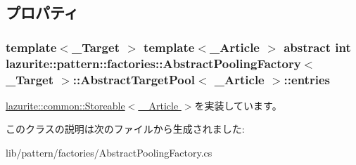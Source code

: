\subsection{プロパティ}
\hypertarget{classlazurite_1_1pattern_1_1factories_1_1_abstract_pooling_factory_3_01___target_01_4_1_1_abstra513b29652c04fa77de240c337e958a8d_aae51e859cb8f4ce8f15dd3db69046711}{
\subsubsection[{entries}]{\setlength{\rightskip}{0pt plus 5cm}template$<$\_\-Target $>$ template$<$\_\-Article $>$ abstract int lazurite::pattern::factories::AbstractPoolingFactory$<$ \_\-Target $>$::AbstractTargetPool$<$ \_\-Article $>$::entries}}
\label{classlazurite_1_1pattern_1_1factories_1_1_abstract_pooling_factory_3_01___target_01_4_1_1_abstra513b29652c04fa77de240c337e958a8d_aae51e859cb8f4ce8f15dd3db69046711}


\hyperlink{interfacelazurite_1_1common_1_1_storeable_3_01___article_01_4_a3af6673c4d90f17fc0bf623319962692}{lazurite::common::Storeable$<$ \_\-Article $>$}を実装しています。

このクラスの説明は次のファイルから生成されました:\begin{DoxyCompactItemize}
\item 
lib/pattern/factories/AbstractPoolingFactory.cs\end{DoxyCompactItemize}
